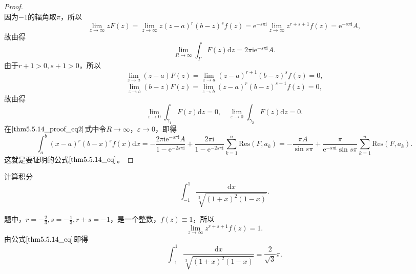 \documentclass[../../main.tex]{subfiles}
\begin{document}
\begin{proof}
\[\]
因为\(-1\)的辐角取\(\pi\)，所以
\[
\lim_{z \to \infty} z F(z) = \lim_{z \to \infty} z (z - a)^r (b - z)^s f(z)
= \mathrm{e}^{-s\pi \mathrm{i}} \lim_{z \to \infty} z^{r + s + 1} f(z)
= \mathrm{e}^{-s\pi \mathrm{i}} A,
\]
故由得
\[
\lim_{R \to \infty} \int_{\Gamma} F(z) \mathrm{d}z = 2\pi \mathrm{i} \mathrm{e}^{-s\pi \mathrm{i}} A.
\]
由于\( r + 1 > 0, s + 1 > 0 \)，所以
\[
\lim_{z \to a} (z - a) F(z) = \lim_{z \to a} (z - a)^{r + 1} (b - z)^s f(z)
= 0,
\]
\[
\lim_{z \to b} (b - z) F(z) = \lim_{z \to b} (z - a)^r (b - z)^{s + 1} f(z)
= 0,
\]
故由得
\[
\lim_{\varepsilon \to 0} \int_{\gamma_1} F(z) \mathrm{d}z = 0,
\quad
\lim_{\varepsilon \to 0} \int_{\gamma_2} F(z) \mathrm{d}z = 0.
\]
在\(\eqref{thm5.5.14_proof_eq2}\)式中令\( R \to \infty \)，\( \varepsilon \to 0 \)，即得
\[
\int_{a}^{b} (x - a)^r (b - x)^s f(x) \mathrm{d}x
= -\frac{2\pi \mathrm{i} \mathrm{e}^{-s\pi \mathrm{i}} A}{1 - \mathrm{e}^{-2s\pi \mathrm{i}}} + \frac{2\pi \mathrm{i}}{1 - \mathrm{e}^{-2s\pi \mathrm{i}}} \sum_{k = 1}^{n} \mathrm{Res}(F, a_k)
= -\frac{\pi A}{\sin s\pi} + \frac{\pi}{\mathrm{e}^{-s\pi \mathrm{i}} \sin s\pi} \sum_{k = 1}^{n} \mathrm{Res}(F, a_k).
\]
这就是要证明的公式\(\eqref{thm5.5.14_eq}\)。
\end{proof}

\begin{example}
计算积分
\[
\int_{-1}^{1} \frac{\mathrm{d}x}{\sqrt[3]{(1 + x)^2 (1 - x)}}.
\]
\end{example}
\begin{solution}
题中，\( r = -\frac{2}{3}, s = -\frac{1}{3}, r + s = -1 \)，是一个整数，\( f(z) \equiv 1 \)，所以
\[
\lim_{z \to \infty} z^{r + s + 1} f(z) = 1.
\]
由公式\(\eqref{thm5.5.14_eq}\)即得
\[
\int_{-1}^{1} \frac{\mathrm{d}x}{\sqrt[3]{(1 + x)^2 (1 - x)}} = \frac{2}{\sqrt{3}} \pi.
\]
\end{solution}
\end{document}
